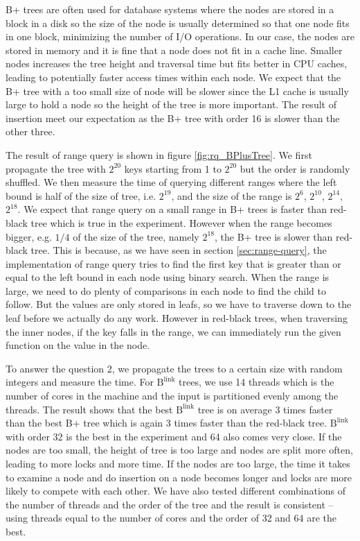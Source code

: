 \documentclass[twoside,11pt,openright]{report}
\theoremstyle{definition}
\begin{document}
B+ trees are often used for database systems where the nodes are stored in a block in a disk so the size of the node is usually determined so that one node fits in one block, minimizing the number of I/O operations. In our case, the nodes are stored in memory and it is fine that a node does not fit in a cache line. Smaller nodes increases the tree height and traversal time but fits better in CPU caches, leading to potentially faster access times within each node. We expect that the B+ tree with a too small size of node will be slower since the L1 cache is usually large to hold a node so the height of the tree is more important. The result of insertion meet our expectation as the B+ tree with order 16 is slower than the other three.

The result of range query is shown in figure \ref{fig:rq_BPlusTree}. We first propagate the tree with $2^{20}$ keys starting from 1 to $2^{20}$ but the order is randomly shuffled. We then measure the time of querying different ranges where the left bound is half of the size of tree, i.e. $2^{19}$, and the size of the range is $2^6$, $2^10$, $2^{14}$, $2^{18}$. We expect that range query on a small range in B+ trees is faster than red-black tree which is true in the experiment. However when the range becomes bigger, e.g. $1/4$ of the size of the tree, namely $2^{18}$, the B+ tree is slower than red-black tree. This is because, as we have seen in section \ref{sec:range-query}, the implementation of range query tries to find the first key that is greater than or equal to the left bound in each node using binary search. When the range is large, we need to do plenty of comparisons in each node to find the child to follow. But the values are only stored in leafs, so we have to traverse down to the leaf before we actually do any work. However in red-black trees, when traversing the inner nodes, if the key falls in the range, we can immediately run the given function on the value in the node.

To answer the question 2, we propagate the trees to a certain size with random integers and measure the time. For $\text{B}^{\text{link}}$ trees, we use 14 threads which is the number of cores in the machine and the input is partitioned evenly among the threads. The result shows that the best $\text{B}^{\text{link}}$ tree is on average 3 times faster than the best B+ tree which is again 3 times faster than the red-black tree. $\text{B}^{\text{link}}$ with order 32 is the best in the experiment and 64 also comes very close. If the nodes are too small, the height of tree is too large and nodes are split more often, leading to more locks and more time. If the nodes are too large, the time it takes to examine a node and do insertion on a node becomes longer and locks are more likely to compete with each other. We have also tested different combinations of the number of threads and the order of the tree and the result is consistent -- using threads equal to the number of cores and the order of 32 and 64 are the best.
\end{document}
